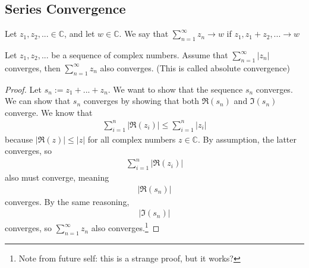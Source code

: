\subsection{Series Convergence}
\begin{definition}
    Let $z_1, z_2, ... \in \mathbb{C}$, and let $w \in \mathbb{C}$. We say that $\sum_{n=1}^\infty z_n \to w$ if $z_1, z_1 + z_2, ... \to w$
\end{definition}
\begin{lemma}
    Let $z_1, z_2, ...$ be a sequence of complex numbers. Assume that $\sum_{n=1}^\infty |z_n|$ converges, then $\sum_{n=1}^\infty z_n$ also converges. (This is called absolute convergence)
\end{lemma}
\begin{proof}
    Let $s_n := z_1 + ... + z_n$. We want to show that the sequence $s_n$ converges. We can show that $s_n$ converges by showing that both $\Re(s_n)$ and $\Im(s_n)$ converge. We know that
    \begin{align}
        \sum_{i=1}^n |\Re(z_i)| \le \sum_{i=1}^n |z_i|
    \end{align}
    because $|\Re(z)| \le |z|$ for all complex numbers $z \in \mathbb{C}$. By assumption, the latter converges, so 
    \begin{align}
        \sum_{i=1}^n |\Re(z_i)|
    \end{align}
    also must converge, meaning
    \begin{align}
        |\Re(s_n)|
    \end{align}
    converges. By the same reasoning,
    \begin{align}
        |\Im(s_n)|
    \end{align}
    converges, so $\sum_{n=1}^\infty z_n$ also converges.\footnote{Note from future self: this is a strange proof, but it works?}
\end{proof}

